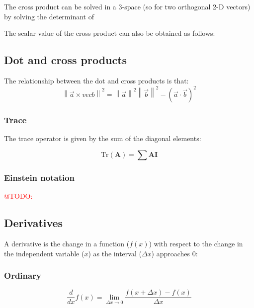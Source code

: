 \documentclass[a4paper,10pt]{scrartcl}
\makeatletter
\newcommand{\todo}[1]{\textcolor{red}{@TODO: #1}}
\makeatother
\begin{document}
The cross product can be solved in a 3-space (so for two orthogonal 2-D vectors) by solving the determinant of

The scalar value of the cross product can also be obtained as follows:

\subsection{Dot and cross products}

The relationship between the dot and cross products is that:
\begin{equation}
 \left\| \vec{a} \times vec{b} \right\|^2  = \left\| \vec{a}\right\|^2  \left\|\vec{b}\right\|^2 - (\vec{a} \cdot \vec{b})^2
\end{equation}



\subsubsection{Trace}

The trace operator is given by the sum of the diagonal elements:

\begin{equation}
 \text{Tr}\left(\mathbf{A}\right) = \sum \mathbf{A} \mathbf{I}
\end{equation}


\subsubsection{Einstein notation}

\todo{}

\subsection{Derivatives}

A derivative is the change in a function ($f(x)$) with respect to the change in the independent variable ($x$) as the interval ($\Delta x$) approaches 0:

\subsubsection{Ordinary}

\begin{equation}
 \frac{d}{{dx}}f\left( x \right) = \mathop {\lim }\limits_{\Delta x \to 0} \frac{{f\left( {x + \Delta x } \right) - f\left( x \right)}}{\Delta x }
\end{equation}
\end{document}
